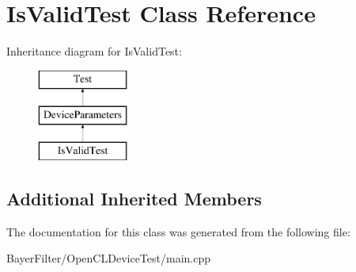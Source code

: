\hypertarget{class_is_valid_test}{\section{Is\-Valid\-Test Class Reference}
\label{class_is_valid_test}
}
Inheritance diagram for Is\-Valid\-Test\-:\begin{figure}[H]
\begin{center}
\leavevmode
\includegraphics[height=3.000000cm]{class_is_valid_test}
\end{center}
\end{figure}
\subsection*{Additional Inherited Members}


The documentation for this class was generated from the following file\-:\begin{DoxyCompactItemize}
\item 
Bayer\-Filter/\-Open\-C\-L\-Device\-Test/main.\-cpp\end{DoxyCompactItemize}
